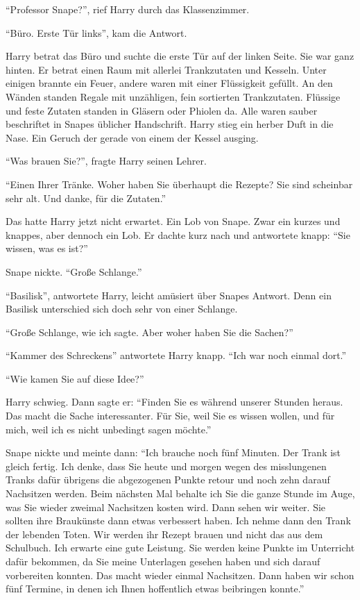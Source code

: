 \trenn

\enquote{Professor Snape?}, rief Harry durch das Klassenzimmer.

\enquote{Büro. Erste Tür links}, kam die Antwort.

Harry betrat das Büro und suchte die erste Tür auf der linken Seite. Sie war ganz hinten. Er betrat einen Raum mit allerlei Trankzutaten und Kesseln. Unter einigen brannte ein Feuer, andere waren mit einer Flüssigkeit gefüllt. An den Wänden standen Regale mit unzähligen, fein sortierten Trankzutaten. Flüssige und feste Zutaten standen in Gläsern oder Phiolen da. Alle waren sauber beschriftet in Snapes üblicher Handschrift. Harry stieg ein herber Duft in die Nase. Ein Geruch der gerade von einem der Kessel ausging.

\enquote{Was brauen Sie?}, fragte Harry seinen Lehrer.

\enquote{Einen Ihrer Tränke. Woher haben Sie überhaupt die Rezepte? Sie sind scheinbar sehr alt. \gst Und danke, für die Zutaten.}

Das hatte Harry jetzt nicht erwartet. Ein Lob von Snape. Zwar ein kurzes und knappes, aber dennoch ein Lob. Er dachte kurz nach und antwortete knapp: \enquote{Sie wissen, was es ist?}

Snape nickte. \enquote{Große Schlange.}

\enquote{Basilisk}, antwortete Harry, leicht amüsiert über Snapes Antwort. Denn ein Basilisk unterschied sich doch sehr von einer Schlange.

\enquote{Große Schlange, wie ich sagte. Aber woher haben Sie die Sachen?}

\enquote{Kammer des Schreckens} antwortete Harry knapp. \enquote{Ich war noch einmal dort.}

\enquote{Wie kamen Sie auf diese Idee?}

Harry schwieg. Dann sagte er: \enquote{Finden Sie es während unserer Stunden heraus. Das macht die Sache interessanter. Für Sie, weil Sie es wissen wollen, und für mich, weil ich es nicht unbedingt sagen möchte.}

Snape nickte und meinte dann: \enquote{Ich brauche noch fünf Minuten. Der Trank ist gleich fertig. Ich denke, dass Sie heute und morgen wegen des misslungenen Tranks \gst dafür übrigens die abgezogenen Punkte retour und noch zehn darauf \gst Nachsitzen werden. Beim nächsten Mal behalte ich Sie die ganze Stunde im Auge, was Sie wieder zweimal Nachsitzen kosten wird. Dann sehen wir weiter. Sie sollten ihre Braukünste dann etwas verbessert haben. Ich nehme dann den Trank der lebenden Toten. Wir werden ihr Rezept brauen und nicht das aus dem Schulbuch. Ich erwarte eine gute Leistung. Sie werden keine Punkte im Unterricht dafür bekommen, da Sie meine Unterlagen gesehen haben und sich darauf vorbereiten konnten. Das macht wieder einmal Nachsitzen. Dann haben wir schon fünf Termine, in denen ich Ihnen hoffentlich etwas beibringen konnte.}

